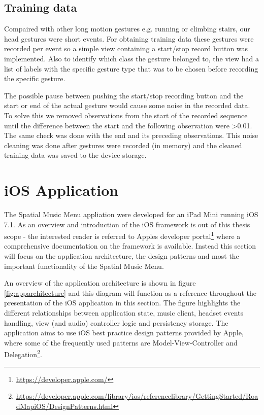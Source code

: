 \subsection{Training data}
Compaired with other long motion gestures e.g. running or climbing stairs, our head gestures were short events. For obtaining training data these gestures were recorded per event so a simple view containing a start/stop record button was implemented. Also to identify which class the gesture belonged to, the view had a list of labels with the specific gesture type that was to be chosen before recording the specific gesture.

The possible pause between pushing the start/stop recording button and the start or end of the actual gesture would cause some noise in the recorded data. To solve this we removed observations from the start of the recorded sequence until the difference between the start and the following observation were \textgreater 0.01. The same check was done with the end and its preceding observations. This noise cleaning was done after gestures were recorded (in memory) and the cleaned training data was saved to the device storage.


\section{iOS Application}
The Spatial Music Menu appliation were developed for an iPad Mini running iOS 7.1. As an overview and introduction of the iOS framework is out of this thesis scope - the interested reader is referred to Apples developer portal\footnote{\url{https://developer.apple.com/}} where a comprehensive documentation on the framework is available. Instead this section will focus on the application architecture, the design patterns and most the important functionality of the Spatial Music Menu.

An overview of the application architecture is shown in figure \ref{fig:apparchitecture} and this diagram will function as a reference throughout the presentation of the iOS application in this section. The figure highlights the different relationships between application state, music client, headset events handling, view (and audio) controller logic and persistency storage. The application aims to use iOS best practice design patterns provided by Apple, where some of the frequently used patterns are Model-View-Controller and Delegation\footnote{\url{https://developer.apple.com/library/ios/referencelibrary/GettingStarted/RoadMapiOS/DesignPatterns.html}}.

